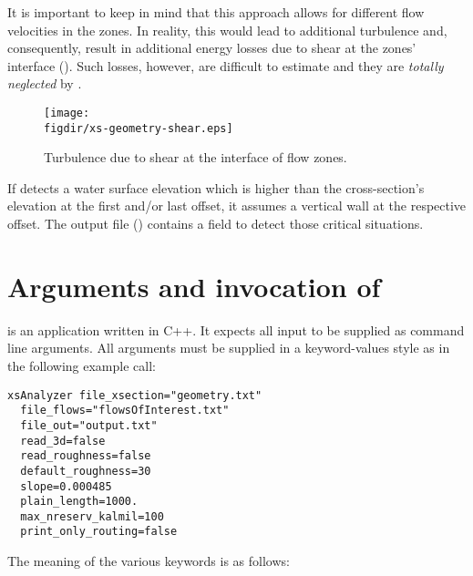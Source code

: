 It is important to keep in mind that this approach allows for different flow velocities in the zones. In reality, this would lead to additional turbulence and, consequently, result in additional energy losses due to shear at the zones' interface (). Such losses, however, are difficult to estimate and they are \emph{totally neglected} by .

\begin{figure}
  \centering
  \texttt{[image: \\figdir/xs-geometry-shear.eps]}
  \caption{Turbulence due to shear at the interface of flow zones. \label{fig:xsanalyzer:shear}}
\end{figure}

If  detects a water surface elevation which is higher than the cross-section's elevation at the first and/or last offset, it assumes a vertical wall at the respective offset. The output file () contains a field to detect those critical situations.

\section{Arguments and invocation of } \label{sec:xsanalyzer:args}

 is an application written in C++. It expects all input to be supplied as command line arguments. All arguments must be supplied in a keyword-values style as in the following example call:

\begin{lstlisting}[style=shell]
xsAnalyzer file_xsection="geometry.txt"
  file_flows="flowsOfInterest.txt"
  file_out="output.txt"
  read_3d=false
  read_roughness=false
  default_roughness=30
  slope=0.000485
  plain_length=1000.
  max_nreserv_kalmil=100
  print_only_routing=false
\end{lstlisting}

The meaning of the various keywords is as follows:

